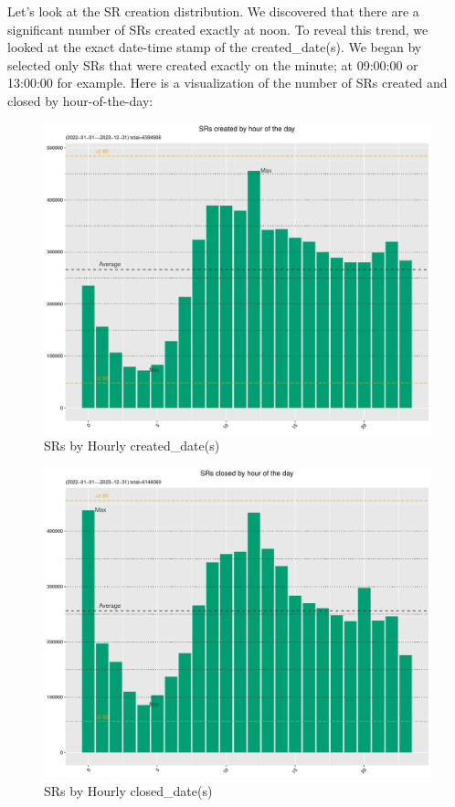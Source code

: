 \documentclass[12pt, titlepage]{article}
\begin{document}
{	Let's look at the SR creation distribution. We discovered that there 
	are a significant number of SRs created exactly at noon. To reveal this trend, 
	we looked at the exact date-time stamp of the created\_date(s). We began 
	by selected only SRs that were created exactly on the minute; at 09:00:00 
	or 13:00:00 for example.  Here is a visualization of the number of SRs 
	created and closed by hour-of-the-day:
	
	\begin{figure}[tbp]
		\centering
		\includegraphics[width = \textwidth]{Created_Hourly_SR_count.pdf}
		\caption{SRs by Hourly created\_date(s)}
		\label{fig:hourly-created}
	\end{figure}	
	
	\begin{figure}[tbp]
		\centering
		\includegraphics[width = \textwidth]{Closed_Hourly_SR_count.pdf}
		\caption{SRs by Hourly closed\_date(s)}
		\label{fig:hourly-closed}
	\end{figure}	
	
}
\end{document}
